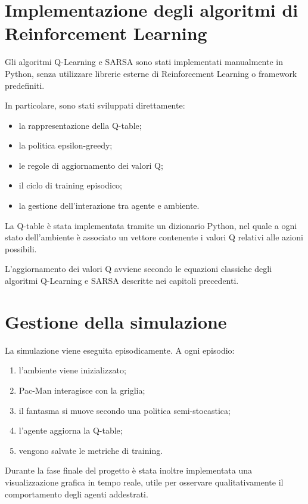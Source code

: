 \documentclass[12pt,a4paper]{report}
\begin{document}
\section{Implementazione degli algoritmi di Reinforcement Learning}

Gli algoritmi Q-Learning e SARSA sono stati implementati manualmente in Python, senza utilizzare librerie esterne di Reinforcement Learning o framework predefiniti.

In particolare, sono stati sviluppati direttamente:
\begin{itemize}
    \item la rappresentazione della Q-table;
    \item la politica epsilon-greedy;
    \item le regole di aggiornamento dei valori Q;
    \item il ciclo di training episodico;
    \item la gestione dell’interazione tra agente e ambiente.
\end{itemize}

La Q-table è stata implementata tramite un dizionario Python, nel quale a ogni stato dell’ambiente è associato un vettore contenente i valori Q relativi alle azioni possibili.

L’aggiornamento dei valori Q avviene secondo le equazioni classiche degli algoritmi Q-Learning e SARSA descritte nei capitoli precedenti.


\section{Gestione della simulazione}

La simulazione viene eseguita episodicamente. A ogni episodio:

\begin{enumerate}
    \item l’ambiente viene inizializzato;
    \item Pac-Man interagisce con la griglia;
    \item il fantasma si muove secondo una politica semi-stocastica;
    \item l’agente aggiorna la Q-table;
    \item vengono salvate le metriche di training.
\end{enumerate}

Durante la fase finale del progetto è stata inoltre implementata una visualizzazione grafica in tempo reale, utile per osservare qualitativamente il comportamento degli agenti addestrati.
\end{document}
